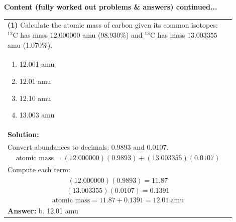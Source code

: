 \documentclass{article}
\begin{document}
\newpage
\noindent
{\large\textbf{Content (fully worked out problems \& answers) continued...}}\\[0.2em]
\vspace{0.2cm}

\begin{tabular}{|p{0.9\linewidth}|}
\hline
\vspace{0.2cm}
\textbf{(1)} Calculate the atomic mass of carbon given its common isotopes: $^{12}\text{C}$ has mass $12.000000$ amu (98.930\%) and $^{13}\text{C}$ has mass $13.003355$ amu (1.070\%). \\
\begin{minipage}[t]{0.85\linewidth}
\begin{enumerate}[label=\alph*.]
\item 12.001 amu \
\item 12.01 amu \
\item 12.10 amu \
\item 13.003 amu
\end{enumerate}
\end{minipage}\\
\hline
\vspace{0.2cm}
\textbf{Solution:} \\
Convert abundances to decimals: $0.9893$ and $0.0107$. \\

\[
\text{atomic mass} = (12.000000)(0.9893)+(13.003355)(0.0107)
\] \\
Compute each term: \\
\[
(12.000000)(0.9893)=11.87
\] \\
\[
(13.003355)(0.0107)=0.1391
\] \\
\[
\text{atomic mass}=11.87+0.1391=12.01~\text{amu}
\] \\ 
\hline
\vspace{0.2cm}
\textbf{Answer:} b. 12.01 amu\\
\hline
\end{tabular}
\end{document}
